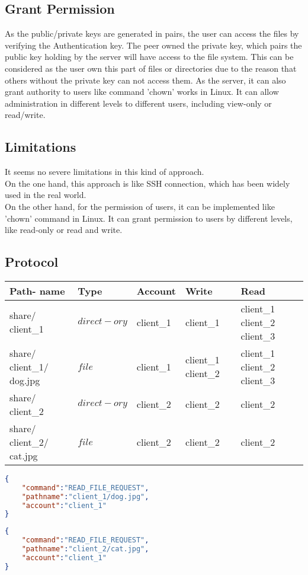 \documentclass[a4paper,10pt,titlepage,twocolumn]{article}
\begin{document}
    \subsection{Grant Permission}
    As the public/private keys are generated in pairs, the user can access the files by verifying the Authentication key. The peer owned the private key, which pairs the public key holding by the server will have access to the file system. This can be considered as the user own this part of files or directories due to the reason that others without the private key can not access them. As the server, it can also grant authority to users like command 'chown' works in Linux. It can allow administration in different levels to different users, including view-only or read/write.
    \subsection{Limitations}
    It seems no severe limitations in this kind of approach. 
\\On the one hand, this approach is like SSH connection, which has been widely used in the real world. 
\\On the other hand, for the permission of users, it can be implemented like 'chown' command in Linux. It can grant permission to users by different levels, like read-only or read and write.
    \subsection{Protocol}
    \begin{tabular}{|p{1.15cm}|p{1.15cm}|p{1.15cm}|p{1.15cm}|p{1.15cm}|}
        \hline
        Path- name & Type & Account & Write & Read \\ \hline

share/ client\_1&$direct- ory$&client\_1&client\_1 &client\_1 client\_2 client\_3 \\ \hline
share/ client\_1/ dog.jpg & $file$&client\_1&client\_1 client\_2 &client\_1 client\_2 client\_3 \\ \hline 
share/ client\_2& $direct- ory$ &client\_2&client\_2&client\_2 \\ \hline
share/ client\_2/ cat.jpg & $file$ &client\_2&client\_2&client\_2 \\ \hline

    \end{tabular}
    \begin{lstlisting}[language=json,firstnumber=1,title=Message 1]
{
    "command":"READ_FILE_REQUEST",
    "pathname":"client_1/dog.jpg",
    "account":"client_1"
}
    \end{lstlisting}
    \begin{lstlisting}[language=json,firstnumber=1,title=Message 2]
{
    "command":"READ_FILE_REQUEST",
    "pathname":"client_2/cat.jpg",
    "account":"client_1"
}
    \end{lstlisting}
\end{document}
